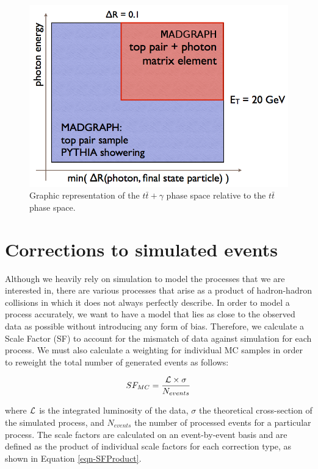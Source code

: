 \begin{figure} 
\begin{center}
\includegraphics[scale=0.5]{Figures/photonphasespace2.png}
\end{center}
\caption{Graphic representation of the $t\bar{t}+\gamma$ phase space relative to the $t\bar{t}$ phase space.}
\label{fig-photonphasespace}
\end{figure}

\section{Corrections to simulated events} \label{sec-SimulatedEventsCorrection}

Although we heavily rely on simulation to model the processes that we are interested in, there are various processes that arise as a product of hadron-hadron collisions in which it does not always perfectly describe. In order to model a process accurately, we want to have a model that lies as close to the observed data as possible without introducing any form of bias. Therefore, we calculate a Scale Factor (SF) to account for the mismatch of data against simulation for each process. We must also calculate a weighting for individual MC samples in order to reweight the total number of generated events as follows:  

\begin{equation}
SF_{MC} = \frac{\mathcal{L} \times \sigma}{N_{events}}
\end{equation}

where $\mathcal{L}$ is the integrated luminosity of the data, $\sigma$ the theoretical cross-section of the simulated process, and $N_{events}$ the number of processed events for a particular process. The scale factors are calculated on an event-by-event basis and are defined as the product of individual scale factors for each correction type, as shown in Equation \ref{eqn-SFProduct}. 

